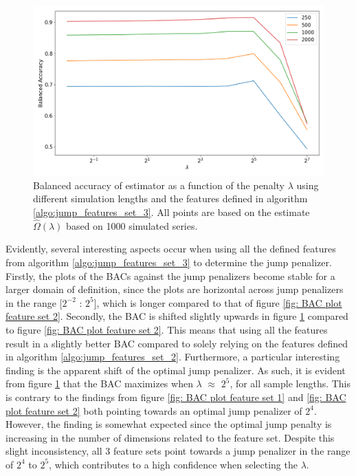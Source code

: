 \begin{figure}[H] 
    \centering
    \includegraphics[width=1\textwidth]{analysis/model_convergence/images/jump_penalties_feature_set_3_all.png}
    \caption [Balanced accuracy of the \jump estimator using feature set 3]{Balanced accuracy of \jump estimator as a function of the penalty $\lambda$ using different simulation lengths and the features defined in algorithm \ref{algo:jump_features_set_3}. All points are based on the estimate $\hat{\Omega} (\lambda)$ based on 1000 simulated series.}
    \label{fig: BAC plot feature set 3}
\end{figure}

Evidently, several interesting aspects occur when using all the defined features from algorithm \ref{algo:jump_features_set_3} to determine the jump penalizer. Firstly, the plots of the BACs against the jump penalizers become stable for a larger domain of definition, since the plots are horizontal across jump penalizers in the range [$2^{-2}$ : $2^5$], which is longer compared to that of figure \ref{fig: BAC plot feature set 2}. Secondly, the BAC is shifted slightly upwards in figure \ref{fig: BAC plot feature set 3} compared to figure \ref{fig: BAC plot feature set 2}. This means that using all the features result in a slightly better BAC compared to solely relying on the features defined in algorithm \ref{algo:jump_features_set_2}. Furthermore, a particular interesting finding is the apparent shift of the optimal jump penalizer. As such, it is evident from figure \ref{fig: BAC plot feature set 3} that the BAC maximizes when $\lambda$ $\approx$ $2^5$, for all sample lengths. This is contrary to the findings from figure \ref{fig: BAC plot feature set 1} and \ref{fig: BAC plot feature set 2} both pointing towards an optimal jump penalizer of $2^4$. However, the finding is somewhat expected since the optimal jump penalty is increasing in the number of dimensions related to the feature set. Despite this slight inconsistency, all 3 feature sets point towards a jump penalizer in the range of $2^4$ to $2^5$, which contributes to a high confidence when selecting the $\lambda$.


